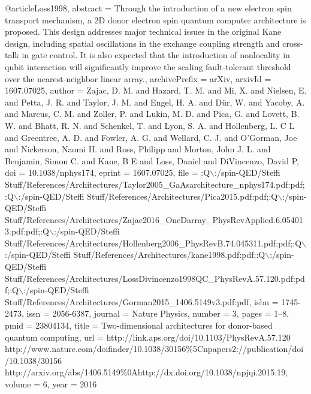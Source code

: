 @article{Loss1998,
abstract = {Through the introduction of a new electron spin transport mechanism, a 2D donor electron spin quantum computer architecture is proposed. This design addresses major technical issues in the original Kane design, including spatial oscillations in the exchange coupling strength and cross-talk in gate control. It is also expected that the introduction of nonlocality in qubit interaction will significantly improve the scaling fault-tolerant threshold over the nearest-neighbor linear array.},
archivePrefix = {arXiv},
arxivId = {1607.07025},
author = {Zajac, D. M. and Hazard, T. M. and Mi, X. and Nielsen, E. and Petta, J. R. and Taylor, J. M. and Engel, H. A. and D{\"{u}}r, W. and Yacoby, A. and Marcus, C. M. and Zoller, P. and Lukin, M. D. and Pica, G. and Lovett, B. W. and Bhatt, R. N. and Schenkel, T. and Lyon, S. A. and Hollenberg, L. C L and Greentree, A. D. and Fowler, A. G. and Wellard, C. J. and O'Gorman, Joe and Nickerson, Naomi H. and Ross, Philipp and Morton, John J. L. and Benjamin, Simon C. and Kane, B E and Loss, Daniel and DiVincenzo, David P},
doi = {10.1038/nphys174},
eprint = {1607.07025},
file = {:Q$\backslash$:/spin-QED/Steffi Stuff/References/Architectures/Taylor2005{\_}GaAsarchitecture{\_}nphys174.pdf:pdf;:Q$\backslash$:/spin-QED/Steffi Stuff/References/Architectures/Pica2015.pdf:pdf;:Q$\backslash$:/spin-QED/Steffi Stuff/References/Architectures/Zajac2016{\_}OneDarray{\_}PhysRevApplied.6.054013.pdf:pdf;:Q$\backslash$:/spin-QED/Steffi Stuff/References/Architectures/Hollenberg2006{\_}PhysRevB.74.045311.pdf:pdf;:Q$\backslash$:/spin-QED/Steffi Stuff/References/Architectures/kane1998.pdf:pdf;:Q$\backslash$:/spin-QED/Steffi Stuff/References/Architectures/LossDivincenzo1998QC{\_}PhysRevA.57.120.pdf:pdf;:Q$\backslash$:/spin-QED/Steffi Stuff/References/Architectures/Gorman2015{\_}1406.5149v3.pdf:pdf},
isbn = {1745-2473},
issn = {2056-6387},
journal = {Nature Physics},
number = {3},
pages = {1--8},
pmid = {23804134},
title = {{Two-dimensional architectures for donor-based quantum computing}},
url = {http://link.aps.org/doi/10.1103/PhysRevA.57.120 http://www.nature.com/doifinder/10.1038/30156{\%}5Cnpapers2://publication/doi/10.1038/30156 http://arxiv.org/abs/1406.5149{\%}0Ahttp://dx.doi.org/10.1038/npjqi.2015.19},
volume = {6},
year = {2016}
}
